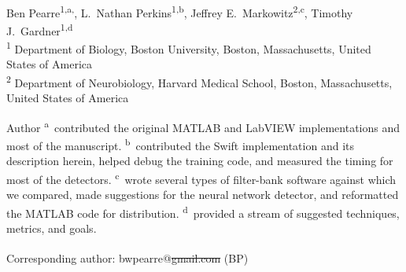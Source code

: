 \documentclass[10pt,letterpaper]{article}
\date{}
\providecommand{\DIFaddtex}[1]{{\protect\color{blue}\uwave{#1}}} %
\providecommand{\DIFdeltex}[1]{{\protect\color{red}\sout{#1}}}                      %
\providecommand{\DIFaddbegin}{} %
\providecommand{\DIFaddend}{} %
\providecommand{\DIFdelbegin}{} %
\providecommand{\DIFdelend}{} %
\providecommand{\DIFadd}[1]{\texorpdfstring{\DIFaddtex{#1}}{#1}} %
\providecommand{\DIFdel}[1]{\texorpdfstring{\DIFdeltex{#1}}{}} %
\newcommand{\DIFscaledelfig}{0.5}
\newlength{\DIFdelgraphicswidth} %
\newlength{\DIFdelgraphicsheight} %
\newcommand{\DIFaddincludegraphics}[2][]{{\color{blue}\fbox{\DIFOincludegraphics[#1]{#2}}}} %
\newcommand{\DIFdelincludegraphics}[2][]{%
\sbox{\DIFdelgraphicsbox}{\DIFOincludegraphics[#1]{#2}}%
\settoboxwidth{\DIFdelgraphicswidth}{\DIFdelgraphicsbox} %
\settoboxtotalheight{\DIFdelgraphicsheight}{\DIFdelgraphicsbox} %
\scalebox{\DIFscaledelfig}{%
\parbox[b]{\DIFdelgraphicswidth}{\usebox{\DIFdelgraphicsbox}\\[-\baselineskip] \rule{\DIFdelgraphicswidth}{0em}}\llap{\resizebox{\DIFdelgraphicswidth}{\DIFdelgraphicsheight}{%
\setlength{\unitlength}{\DIFdelgraphicswidth}%
\begin{picture}(1,1)%
\thicklines\linethickness{2pt} %
{\color[rgb]{1,0,0}\put(0,0){\framebox(1,1){}}}%
{\color[rgb]{1,0,0}\put(0,0){\line( 1,1){1}}}%
{\color[rgb]{1,0,0}\put(0,1){\line(1,-1){1}}}%
\end{picture}%
}\hspace*{3pt}}} %
} %
\DeclareRobustCommand{\DIFaddbegin}{\DIFOaddbegin \let\includegraphics\DIFaddincludegraphics} %
\DeclareRobustCommand{\DIFaddend}{\DIFOaddend \let\includegraphics\DIFOincludegraphics} %
\DeclareRobustCommand{\DIFdelbegin}{\DIFOdelbegin \let\includegraphics\DIFdelincludegraphics} %
\DeclareRobustCommand{\DIFdelend}{\DIFOaddend \let\includegraphics\DIFOincludegraphics} %
\begin{document}
\vspace*{0.35in}

\begin{flushleft}
{\Large
\textbf{}
}
\newline
\\
Ben Pearre\textsuperscript{1,a,\textcurrency},
L.~Nathan Perkins\textsuperscript{1,b},
Jeffrey E.~Markowitz\textsuperscript{2,c},
Timothy J.~Gardner\textsuperscript{1,d}
\\
\bigskip
\textsuperscript{1} Department of Biology, Boston University, Boston, Massachusetts, United States of America\\
\textsuperscript{2} Department of Neurobiology, Harvard Medical School, Boston, Massachusetts, United States of America
\\
\bigskip

% 
%
Author \textsuperscript{a}~contributed the original MATLAB and LabVIEW implementations and most of the manuscript.
\textsuperscript{b}~contributed the Swift implementation and its description herein, helped debug the training code, and measured the timing for most of the detectors.
\textsuperscript{c}~wrote several types of filter-bank software against which we compared, made suggestions for the neural network detector, and reformatted the MATLAB code for distribution.
\textsuperscript{d}~provided a stream of suggested techniques, metrics, and goals.





\textsuperscript{\textcurrency} Corresponding author: bwpearre@\DIFdelbegin \DIFdel{gmail.com }\DIFdelend \DIFaddbegin \DIFadd{bu.edu }\DIFaddend (BP)

\end{flushleft}
\end{document}
